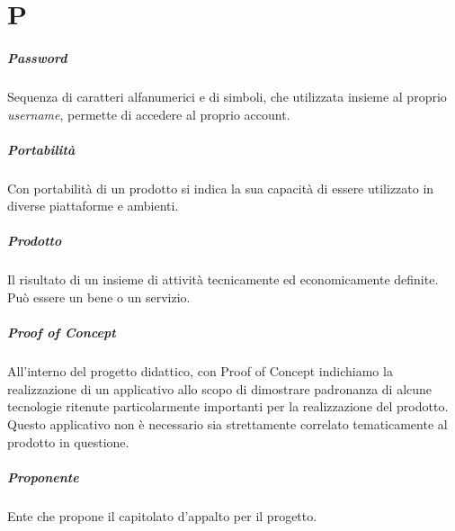 \chapter{P}

\paragraph*{Password}
Sequenza di caratteri alfanumerici e di simboli, che utilizzata insieme al proprio \textit{username}, permette di accedere al proprio account.

\paragraph*{Portabilità}
Con portabilità di un prodotto si indica la sua capacità di essere utilizzato in diverse piattaforme e ambienti.

\paragraph*{Prodotto}
Il risultato di un insieme di attività tecnicamente ed economicamente definite. Può essere un bene o un servizio.

\paragraph*{Proof of Concept}
All'interno del progetto didattico, con Proof of Concept indichiamo la realizzazione di un applicativo allo scopo di dimostrare padronanza di alcune tecnologie ritenute particolarmente importanti per la realizzazione del prodotto. Questo applicativo non è necessario sia strettamente correlato tematicamente al prodotto in questione.

\paragraph*{Proponente}
Ente che propone il capitolato d'appalto per il progetto.